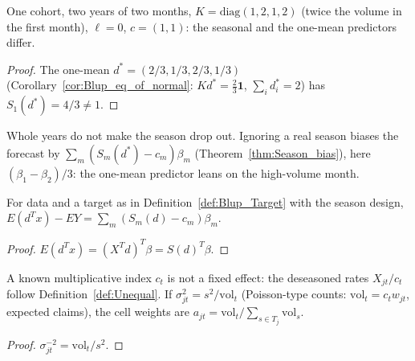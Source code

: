 \begin{theorem}\label{thm:Season_ne}
  \leanok
  One cohort, two years of two months, $K = \mathrm{diag}(1, 2, 1, 2)$ (twice the volume in the
  first month), $\ell = 0$, $c = (1, 1)$: the seasonal and the one-mean predictors differ.
\end{theorem}
\begin{proof}
  \leanok
  The one-mean $d^* = (2/3, 1/3, 2/3, 1/3)$ (Corollary~\ref{cor:Blup_eq_of_normal}: $Kd^* =
  \tfrac23\mathbf 1$, $\sum_i d^*_i = 2$) has $S_1(d^*) = 4/3 \ne 1$.
\end{proof}

\begin{remark}[Finding 24]\label{rem:season}
  Whole years do not make the season drop out. Ignoring a real season biases the forecast
  by $\sum_m (S_m(d^*) - c_m)\beta_m$ (Theorem~\ref{thm:Season_bias}), here $(\beta_1 -
  \beta_2)/3$: the one-mean predictor leans on the high-volume month.
\end{remark}

\begin{theorem}\label{thm:Season_bias}
  \leanok
  For data and a target as in Definition~\ref{def:Blup_Target} with the season design,
  $E(d^Tx) - E Y = \sum_m (S_m(d) - c_m)\beta_m$.
\end{theorem}
\begin{proof}
  \leanok
  $E(d^Tx) = (X^Td)^T\beta = S(d)^T\beta$.
\end{proof}

\begin{lemma}\label{lem:Season_known_index}
  \leanok
  A known multiplicative index $c_t$ is not a fixed effect: the deseasoned rates $X_{jt}/c_t$
  follow Definition~\ref{def:Unequal}. If $\sigma_{jt}^2 = s^2/\mathrm{vol}_t$ (Poisson-type
  counts: $\mathrm{vol}_t = c_tw_{jt}$, expected claims), the cell weights are
  $a_{jt} = \mathrm{vol}_t / \sum_{s\in T_j}\mathrm{vol}_s$.
\end{lemma}
\begin{proof}
  \leanok
  $\sigma_{jt}^{-2} = \mathrm{vol}_t/s^2$.
\end{proof}

